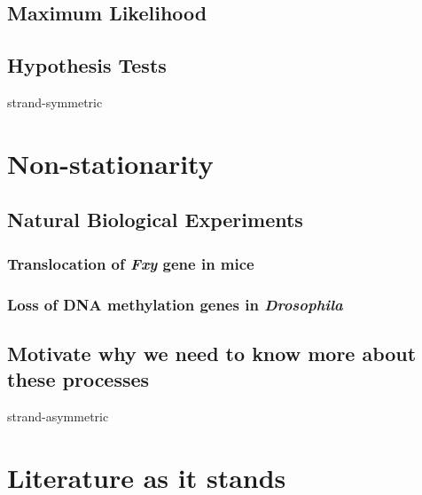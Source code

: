 \subsection{Maximum Likelihood}

\subsection{Hypothesis Tests}

\gls{strand-symmetric}

\section{Non-stationarity}

\subsection{Natural Biological Experiments}

\subsubsection{Translocation of \textit{Fxy} gene in mice}

\subsubsection{Loss of DNA methylation genes in \textit{Drosophila}}

\subsection{Motivate why we need to know more about these processes}

\gls{strand-asymmetric}

\section{Literature as it stands}